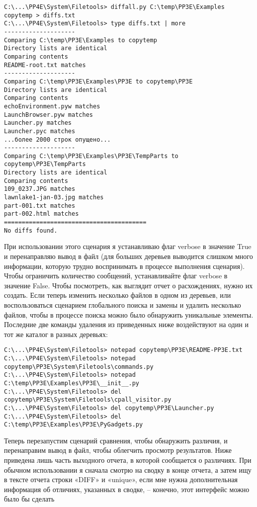 \documentclass[12pt]{article}
\begin{document}
\begin{verbatim}
C:\...\PP4E\System\Filetools> diffall.py C:\temp\PP3E\Examples
copytemp > diffs.txt
C:\...\PP4E\System\Filetools> type diffs.txt | more
--------------------
Comparing C:\temp\PP3E\Examples to copytemp
Directory lists are identical
Comparing contents
README-root.txt matches
--------------------
Comparing C:\temp\PP3E\Examples\PP3E to copytemp\PP3E
Directory lists are identical
Comparing contents
echoEnvironment.pyw matches
LaunchBrowser.pyw matches
Launcher.py matches
Launcher.pyc matches
...более 2000 строк опущено...
--------------------
Comparing C:\temp\PP3E\Examples\PP3E\TempParts to copytemp\PP3E\TempParts
Directory lists are identical
Comparing contents
109_0237.JPG matches
lawnlake1-jan-03.jpg matches
part-001.txt matches
part-002.html matches
========================================
No diffs found.
\end{verbatim}
При использовании этого сценария я устанавливаю флаг verbose
в значение True и перенаправляю вывод в файл (для больших деревьев
выводится слишком много информации, которую трудно воспринимать в процессе выполнения сценария). Чтобы ограничить количество
сообщений, устанавливайте флаг verbose в значение False. Чтобы посмотреть, как выглядит отчет о расхождениях, нужно их создать. Если теперь изменить несколько файлов в одном из деревьев, или воспользоваться сценарием глобального поиска и замены и удалить несколько файлов,
чтобы в процессе поиска можно было обнаружить уникальные элементы. Последние две команды удаления из приведенных ниже воздействуют на один и тот же каталог в разных деревьях:
\begin{verbatim}
C:\...\PP4E\System\Filetools> notepad copytemp\PP3E\README-PP3E.txt
C:\...\PP4E\System\Filetools> notepad copytemp\PP3E\System\Filetools\commands.py
C:\...\PP4E\System\Filetools> notepad C:\temp\PP3E\Examples\PP3E\__init__.py
C:\...\PP4E\System\Filetools> del copytemp\PP3E\System\Filetools\cpall_visitor.py
C:\...\PP4E\System\Filetools> del copytemp\PP3E\Launcher.py
C:\...\PP4E\System\Filetools> del C:\temp\PP3E\Examples\PP3E\PyGadgets.py
\end{verbatim}
Теперь перезапустим сценарий сравнения, чтобы обнаружить различия, и перенаправим вывод в файл, чтобы облегчить просмотр результатов. Ниже приведена лишь часть выходного отчета, в которой сообщается о различиях. При обычном использовании я сначала смотрю
на сводку в конце отчета, а затем ищу в тексте отчета строки «DIFF» и «unique», если мне нужна дополнительная информация об отличиях,
указанных в сводке, – конечно, этот интерфейс можно было бы сделать
\end{document}
